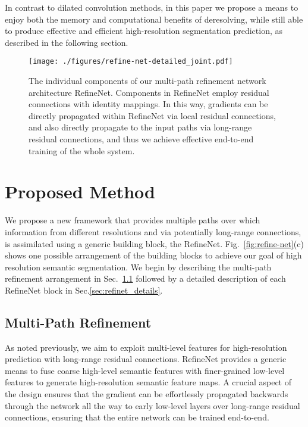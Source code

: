 \documentclass[10pt,twocolumn,letterpaper]{article}
\newcommand{\Fig}{Fig.\xspace}
\newcommand{\Sec}{Sec.\xspace}
\newcommand{\refOurFig}{\ref{fig:refine-net}(c)\xspace}
\begin{document}
In contrast to dilated convolution methods, in this paper we propose a means to enjoy both the memory and computational benefits of deresolving, while still able to produce effective and efficient high-resolution segmentation prediction, as described in the following section.



\begin{figure*}[t]
	\centering	
	\texttt{[image: ./figures/refine-net-detailed\_joint.pdf]}	
\caption{The individual components of our multi-path refinement network architecture RefineNet. Components in RefineNet employ residual connections with identity mappings. In this way, gradients can be directly propagated  within RefineNet via local residual connections, and also directly propagate to the input paths via long-range residual connections, 
and thus we achieve effective end-to-end training of the whole system.}
\label{fig:refine-net-detailed-joint}
\end{figure*}





\section{Proposed Method}
\label{sec:refine-net}

We propose a new framework that provides multiple paths over which information from different resolutions and via potentially long-range connections, is assimilated using a generic building block, the RefineNet. \Fig~\refOurFig shows one possible arrangement of the building blocks to achieve our goal of high resolution semantic segmentation.  We begin by describing the multi-path refinement arrangement in \Sec~\ref{sec:method-overview} followed by a detailed description of each RefineNet block in \Sec\ref{sec:refinet_details}.





\subsection{Multi-Path Refinement}
\label{sec:method-overview}

As noted previously, we aim to exploit multi-level features for high-resolution prediction with long-range residual connections. 
RefineNet provides a generic means to fuse coarse high-level semantic features with finer-grained low-level features to generate high-resolution semantic feature maps. A crucial aspect of the design ensures that the gradient can be effortlessly propagated backwards through the network all the way to early low-level layers over long-range residual connections, ensuring that the entire network can be trained end-to-end. 
\end{document}
